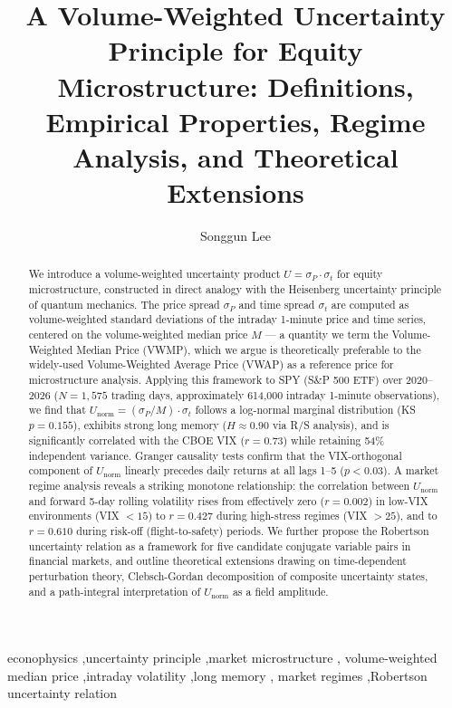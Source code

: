 \documentclass[preprint,12pt]{elsarticle}
\begin{document}
\begin{frontmatter}

\title{A Volume-Weighted Uncertainty Principle for Equity Microstructure:
Definitions, Empirical Properties, Regime Analysis, and Theoretical Extensions}

\author[ucsb]{Songgun Lee}
\address[ucsb]{Department of Physics, University of California, Santa Barbara,
Santa Barbara, CA 93106, USA}

\begin{abstract}
We introduce a volume-weighted uncertainty product $U = \sigma_P \cdot \sigma_t$ for equity microstructure, constructed in direct analogy with the Heisenberg uncertainty principle of quantum mechanics. The price spread $\sigma_P$ and time spread $\sigma_t$ are computed as volume-weighted standard deviations of the intraday 1-minute price and time series, centered on the volume-weighted median price $M$ --- a quantity we term the Volume-Weighted Median Price (VWMP), which we argue is theoretically preferable to the widely-used Volume-Weighted Average Price (VWAP) as a reference price for microstructure analysis. Applying this framework to SPY (S\&P 500 ETF) over 2020--2026 ($N = 1{,}575$ trading days, approximately 614{,}000 intraday 1-minute observations), we find that $U_\mathrm{norm} = (\sigma_P/M)\cdot\sigma_t$ follows a log-normal marginal distribution (KS $p = 0.155$), exhibits strong long memory ($H \approx 0.90$ via R/S analysis), and is significantly correlated with the CBOE VIX ($r = 0.73$) while retaining 54\% independent variance. Granger causality tests confirm that the VIX-orthogonal component of $U_\mathrm{norm}$ linearly precedes daily returns at all lags 1--5 ($p < 0.03$). A market regime analysis reveals a striking monotone relationship: the correlation between $U_\mathrm{norm}$ and forward 5-day rolling volatility rises from effectively zero ($r = 0.002$) in low-VIX environments (VIX $< 15$) to $r = 0.427$ during high-stress regimes (VIX $> 25$), and to $r = 0.610$ during risk-off (flight-to-safety) periods. We further propose the Robertson uncertainty relation as a framework for five candidate conjugate variable pairs in financial markets, and outline theoretical extensions drawing on time-dependent perturbation theory, Clebsch-Gordan decomposition of composite uncertainty states, and a path-integral interpretation of $U_\mathrm{norm}$ as a field amplitude.
\end{abstract}

\begin{keyword}
econophysics \sep uncertainty principle \sep market microstructure \sep
volume-weighted median price \sep intraday volatility \sep long memory \sep
market regimes \sep Robertson uncertainty relation
\end{keyword}

\end{frontmatter}
\end{document}
